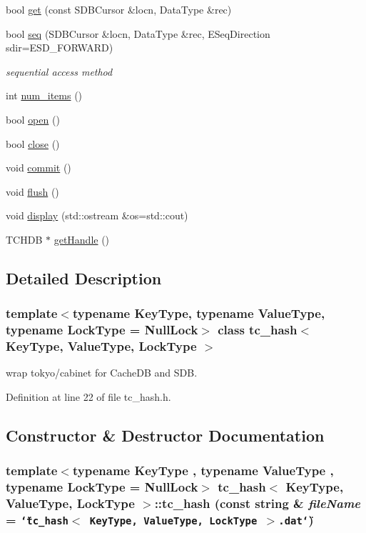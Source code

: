 \begin{CompactItemize}
\item 
bool \hyperlink{classtc__hash_43f0d4a9a0ceda515d782000b81928c3}{get} (const SDBCursor \&locn, DataType \&rec)
\item 
bool \hyperlink{classtc__hash_25d62cc64ce4c777c279101dca5aa846}{seq} (SDBCursor \&locn, DataType \&rec, ESeqDirection sdir=ESD\_\-FORWARD)
\begin{CompactList}\small\item\em sequential access method \item\end{CompactList}\item 
int \hyperlink{classtc__hash_51837772025d390b3a9b1c87ec15309d}{num\_\-items} ()
\item 
bool \hyperlink{classtc__hash_782627d77d2ef0bab952c38992c5c743}{open} ()
\item 
bool \hyperlink{classtc__hash_8153ff6485a0382fac5b5a20c0cc9033}{close} ()
\item 
void \hyperlink{classtc__hash_83474cdc095650dfea677f3b65aaa032}{commit} ()
\item 
void \hyperlink{classtc__hash_3ffb4206aed13ea94ff623cc46d971da}{flush} ()
\item 
void \hyperlink{classtc__hash_b29bf2580a2dc3b10497ea920bf98f00}{display} (std::ostream \&os=std::cout)
\item 
TCHDB $\ast$ \hyperlink{classtc__hash_ab77b561b8897ccdca73515233493f7a}{getHandle} ()
\end{CompactItemize}


\subsection{Detailed Description}
\subsubsection*{template$<$typename KeyType, typename ValueType, typename LockType = NullLock$>$ class tc\_\-hash$<$ KeyType, ValueType, LockType $>$}

wrap tokyo/cabinet for CacheDB and SDB. 

Definition at line 22 of file tc\_\-hash.h.

\subsection{Constructor \& Destructor Documentation}
\hypertarget{classtc__hash_f65eca712c3a612bb1ce1defa865659f}{
\subsubsection[{tc\_\-hash}]{\setlength{\rightskip}{0pt plus 5cm}template$<$typename KeyType , typename ValueType , typename LockType  = NullLock$>$ {\bf tc\_\-hash}$<$ KeyType, ValueType, LockType $>$::{\bf tc\_\-hash} (const string \& {\em fileName} = {\tt \char`\"{}tc\_\-hash$<$~KeyType,~ValueType,~LockType~$>$.dat\char`\"{}})}}
\label{classtc__hash_f65eca712c3a612bb1ce1defa865659f}


